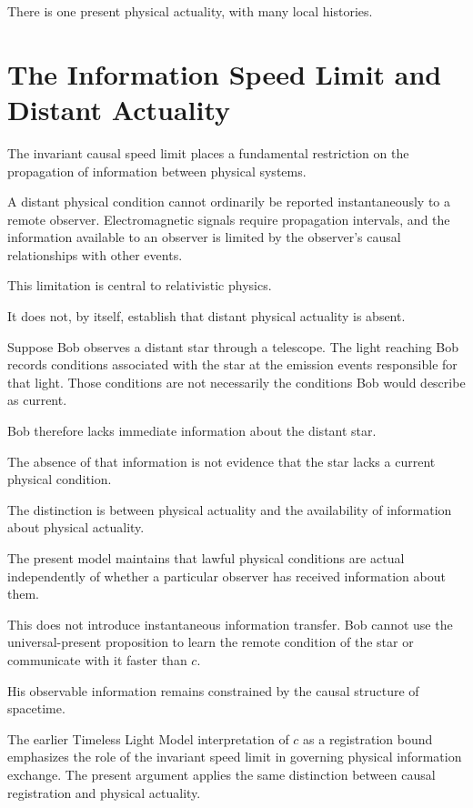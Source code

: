 \documentclass[12pt,onecolumn]{article}
\begin{document}
There is one present physical actuality, with many local histories.

\section{The Information Speed Limit and Distant Actuality}

The invariant causal speed limit places a fundamental restriction on the propagation of information between physical systems.

A distant physical condition cannot ordinarily be reported instantaneously to a remote observer. Electromagnetic signals require propagation intervals, and the information available to an observer is limited by the observer's causal relationships with other events.

This limitation is central to relativistic physics.

It does not, by itself, establish that distant physical actuality is absent.

Suppose Bob observes a distant star through a telescope. The light reaching Bob records conditions associated with the star at the emission events responsible for that light. Those conditions are not necessarily the conditions Bob would describe as current.

Bob therefore lacks immediate information about the distant star.

The absence of that information is not evidence that the star lacks a current physical condition.

The distinction is between physical actuality and the availability of information about physical actuality.

The present model maintains that lawful physical conditions are actual independently of whether a particular observer has received information about them.

This does not introduce instantaneous information transfer. Bob cannot use the universal-present proposition to learn the remote condition of the star or communicate with it faster than \(c\).

His observable information remains constrained by the causal structure of spacetime.

The earlier Timeless Light Model interpretation of \(c\) as a registration bound \cite{cBound} emphasizes the role of the invariant speed limit in governing physical information exchange. The present argument applies the same distinction between causal registration and physical actuality.
\end{document}
